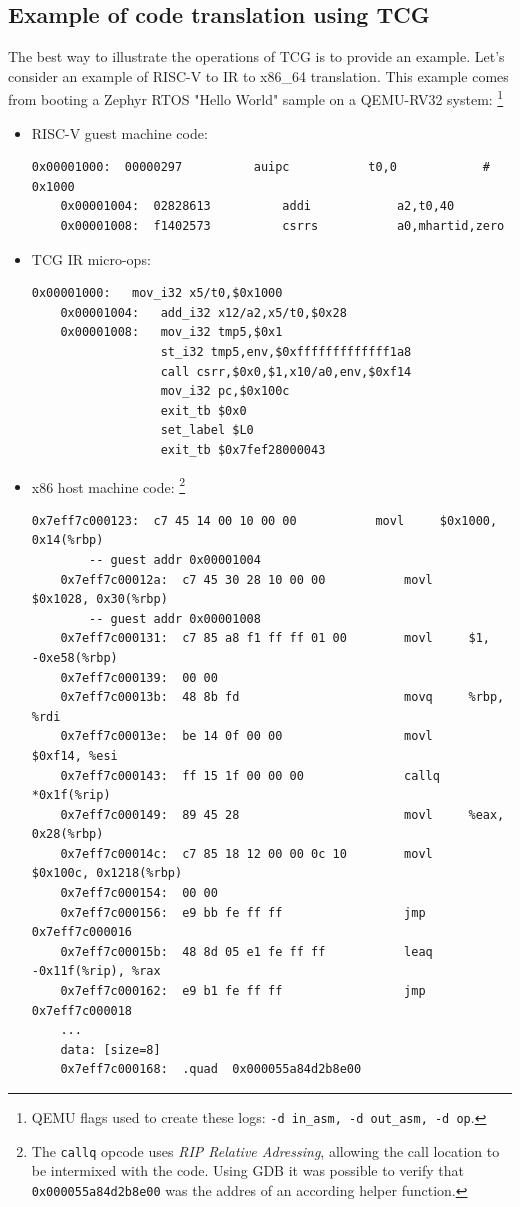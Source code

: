 \pagebreak
\subsection{Example of code translation using TCG}

The best way to illustrate the operations of TCG is to provide an example. Let's consider an example of RISC-V to IR to
x86\_64 translation. This example comes from booting a Zephyr RTOS "Hello World" sample on a QEMU-RV32 system:
\footnote{QEMU flags used to create these logs: \texttt{-d in\_asm, -d out\_asm, -d op}.}

\begin{itemize}
    \item{RISC-V guest machine code:
    \begin{lstlisting}[frame=tblr]
    0x00001000:  00000297          auipc           t0,0            # 0x1000
    0x00001004:  02828613          addi            a2,t0,40
    0x00001008:  f1402573          csrrs           a0,mhartid,zero
    \end{lstlisting}
    }
    \item{TCG IR micro-ops:
    \begin{lstlisting}[frame=tblr, label={lst:tcg:tcgir-microops}]
    0x00001000:   mov_i32 x5/t0,$0x1000
    0x00001004:   add_i32 x12/a2,x5/t0,$0x28
    0x00001008:   mov_i32 tmp5,$0x1
                  st_i32 tmp5,env,$0xfffffffffffff1a8
                  call csrr,$0x0,$1,x10/a0,env,$0xf14
                  mov_i32 pc,$0x100c
                  exit_tb $0x0
                  set_label $L0
                  exit_tb $0x7fef28000043
    \end{lstlisting}
    }
    \item{x86 host machine code:%
    \footnote{The \texttt{callq} opcode uses \textit{RIP Relative Adressing}, allowing the call location to be
    intermixed with the code. Using GDB it was possible to verify that \texttt{0x000055a84d2b8e00}
    was the addres of an according helper function.}
    \begin{lstlisting}[frame=tblr, label={lst:tcg:x86translated}]
    0x7eff7c000123:  c7 45 14 00 10 00 00           movl     $0x1000, 0x14(%rbp)
        -- guest addr 0x00001004
    0x7eff7c00012a:  c7 45 30 28 10 00 00           movl     $0x1028, 0x30(%rbp)
        -- guest addr 0x00001008
    0x7eff7c000131:  c7 85 a8 f1 ff ff 01 00        movl     $1, -0xe58(%rbp)
    0x7eff7c000139:  00 00
    0x7eff7c00013b:  48 8b fd                       movq     %rbp, %rdi
    0x7eff7c00013e:  be 14 0f 00 00                 movl     $0xf14, %esi
    0x7eff7c000143:  ff 15 1f 00 00 00              callq    *0x1f(%rip)
    0x7eff7c000149:  89 45 28                       movl     %eax, 0x28(%rbp)
    0x7eff7c00014c:  c7 85 18 12 00 00 0c 10        movl     $0x100c, 0x1218(%rbp)
    0x7eff7c000154:  00 00
    0x7eff7c000156:  e9 bb fe ff ff                 jmp      0x7eff7c000016
    0x7eff7c00015b:  48 8d 05 e1 fe ff ff           leaq     -0x11f(%rip), %rax
    0x7eff7c000162:  e9 b1 fe ff ff                 jmp      0x7eff7c000018
    ...
    data: [size=8]
    0x7eff7c000168:  .quad  0x000055a84d2b8e00
    \end{lstlisting}
    }
\end{itemize}

